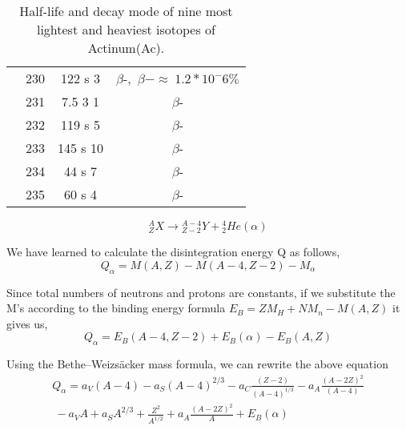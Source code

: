 \begin{table}[ht]
\begin{adjustbox}{width=0.8\textwidth}
\begin{tabular}{|l|c|c|c|}
                       {} & {230} & {122 s 3} & {$\beta$-,~$\beta-\approx~ 1.2*10^-6\% $}\\[0.5em]
                       
                       {} & {231} & {7.5 3 1} & {$\beta$-}\\
                       
                       {} & {232} & {119 s 5} & {$\beta$-}\\
                       
                       {} & {233} & {145 s 10} & {$\beta$-}\\
                       
                       {} & {234} & {44 s 7} & {$\beta$-}\\
                       
                       {} & {235} & {60 s 4} & {$\beta$-}\\
                       
                       \hline
                  
        \end{tabular}            
        \end{adjustbox}

 \label{tab:table_decaymode}
\caption{Half-life and decay mode of nine most lightest and heaviest isotopes of Actinum(Ac).}
 \end{table}
    \begin{equation}
   {}^{A}_{Z}X  \longrightarrow {}^{A-4}_{Z-2}Y +{}^{4}_{2}He(\alpha)
     \end{equation}

We have learned to calculate the disintegration energy Q as follows,
\begin{equation}
Q_\alpha=M(A,Z)- M(A-4,Z-2)-M_\alpha
\end{equation}

Since total numbers of neutrons and protons are constants, if we substitute the M’s according
to the binding energy formula $E_B=ZM_H+NM_n-M(A, Z)$
it gives us,
\begin{equation}
Q_\alpha=E_B(A-4,Z-2)+E_B(\alpha)-E_B(A,Z)
\end{equation}   
   
 Using the Bethe–Weizsäcker mass formula, we can rewrite the above equation
\begin{multline}
Q_\alpha=a_V(A-4)-a_S(A-4)^{2/3}-a_C\frac{(Z-2)}{(A-4)^{1/3}}-a_A\frac{(A-2Z)^2}{(A-4)}\\
~-a_VA+a_SA^{2/3}+\frac{Z^2}{A^{1/2}}+a_A\frac{(A-2Z)^2}{A}+E_B(\alpha)
\end{multline} 

